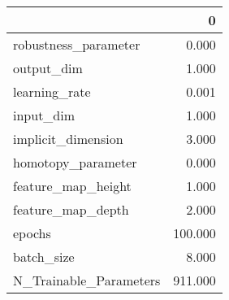 \begin{tabular}{lr}
\toprule
{} &        0 \\
\midrule
robustness\_parameter   &    0.000 \\
output\_dim             &    1.000 \\
learning\_rate          &    0.001 \\
input\_dim              &    1.000 \\
implicit\_dimension     &    3.000 \\
homotopy\_parameter     &    0.000 \\
feature\_map\_height     &    1.000 \\
feature\_map\_depth      &    2.000 \\
epochs                 &  100.000 \\
batch\_size             &    8.000 \\
N\_Trainable\_Parameters &  911.000 \\
\bottomrule
\end{tabular}
